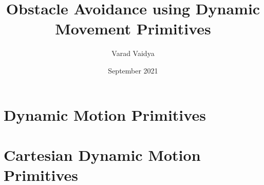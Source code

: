 \documentclass[12pt,A4paper]{report}
\title{Obstacle Avoidance using Dynamic Movement Primitives}
\author{Varad Vaidya}
\date{September 2021}
\begin{document}


\tableofcontents

\chapter{Dynamic Motion Primitives}


% 
\chapter{Cartesian Dynamic Motion Primitives}

\end{document}
